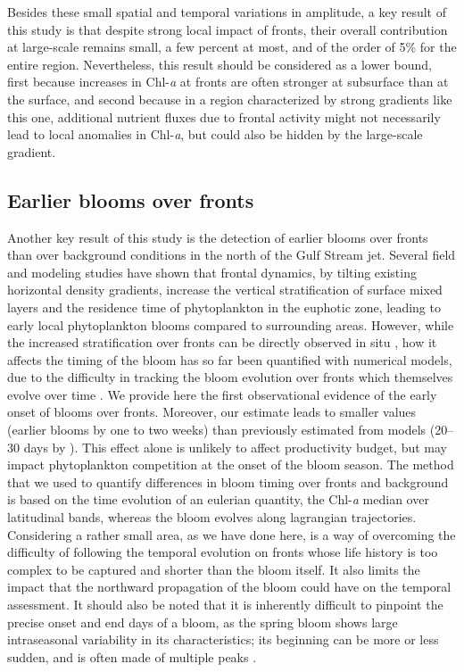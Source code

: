 Besides these small spatial and temporal variations in amplitude, a key result of this study is that despite strong local impact of fronts, their overall contribution at large-scale remains small, a few percent at most, and of the order of 5\% for the entire region.
Nevertheless, this result should be considered as a lower bound, first because increases in Chl\nobreakdash-\emph{a} at fronts are often stronger at subsurface than at the surface, and second because in a region characterized by strong gradients like this one, additional nutrient fluxes due to frontal activity might not necessarily lead to local anomalies in Chl\nobreakdash-\emph{a}, but could also be hidden by the large-scale gradient.


\subsection{Earlier blooms over fronts}

Another key result of this study is the detection of earlier blooms over fronts than over background conditions in the north of the Gulf Stream jet.
Several field and modeling studies have shown that frontal dynamics, by tilting existing horizontal density gradients, increase the vertical stratification of surface mixed layers \citep{taylor_2011} and the residence time of phytoplankton in the euphotic zone, leading to early local phytoplankton blooms compared to surrounding areas.
However, while the increased stratification over fronts can be directly observed in situ \citep{karleskind_2011, mahadevan_2012}, how it affects the timing of the bloom has so far been quantified with numerical models, due to the difficulty in tracking the bloom evolution over fronts which themselves evolve over time \citep{levy_2000, karleskind_2011, mahadevan_2012}.
We provide here the first observational evidence of the early onset of blooms over fronts.
Moreover, our estimate leads to smaller values (earlier blooms by one to two weeks) than previously estimated from models (20--30 days by \citet{mahadevan_2012}).
This effect alone is unlikely to affect productivity budget, but may impact phytoplankton competition at the onset of the bloom season.
The method that we used to quantify differences in bloom timing over fronts and background is based on the time evolution of an eulerian quantity, the Chl\nobreakdash-\emph{a} median over latitudinal bands, whereas the bloom evolves along lagrangian trajectories.
Considering a rather small area, as we have done here, is a way of overcoming the difficulty of following the temporal evolution on fronts whose life history is too complex to be captured and shorter than the bloom itself.
It also limits the impact that the northward propagation of the bloom could have on the temporal assessment.
It should also be noted that it is inherently difficult to pinpoint the precise onset and end days of a bloom, as the spring bloom shows large intraseasonal variability in its characteristics; its beginning can be more or less sudden, and is often made of multiple peaks \citep{keerthi_2020}.


